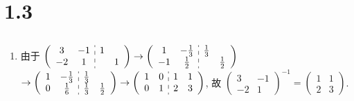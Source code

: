 \section{1.3}


 \subsection{} %


	 \paragraph{} %
		 \begin{enumerate}
			 \item %
			       由于 $\left(\begin{array}{cc:cc}
						       3  & -1 & 1 &   \\
						       -2 & 1  &   & 1
					       \end{array}\right) \to \left(\begin{array}{cc:cc}
						       1  & -\frac{1}{3} & \frac{1}{3} &             \\
						       -1 & \frac{1}{2}  &             & \frac{1}{2}
					       \end{array}\right)$
			       $\to \left(\begin{array}{cc:cc}
						       1 & -\frac{1}{3} & \frac{1}{3} &             \\
						       0 & \frac{1}{6}  & \frac{1}{3} & \frac{1}{2}
					       \end{array}\right) \to \left(\begin{array}{cc:cc}
						       1 & 0 & 1 & 1 \\
						       0 & 1 & 2 & 3
					       \end{array}\right)$,
			       故 $\begin{pmatrix}
					       3  & -1 \\
					       -2 & 1
				       \end{pmatrix}^{-1} = \begin{pmatrix}
					       1 & 1 \\
					       2 & 3
				       \end{pmatrix}$.


\end{enumerate}
